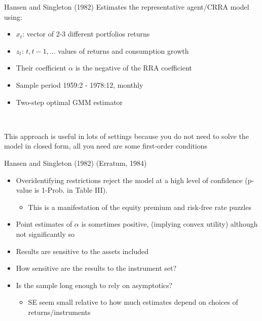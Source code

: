 \documentclass[xcolor=table, aspectratio=169]{beamer}
\begin{document}
\begin{frame}{Hansen and Singleton (1982)}
Estimates the representative agent/CRRA model using:
\begin{itemize}
\item $x_{t}$: vector of 2-3 different portfolios returns
\item $z_{t}$: $t, t-1, \ldots$ values of returns and consumption growth
\item Their coefficient $\alpha$ is the negative of the RRA coefficient
\item Sample period 1959:2 - 1978:12, monthly
\item Two-step optimal GMM estimator
\end{itemize}

~

This approach is useful in lots of settings because you do not need to solve the model in closed form, all you need are some first-order conditions
\end{frame}



\begin{frame}{Hansen and Singleton (1982) (Erratum, 1984)}
\begin{itemize}
\item Overidentifying restrictions reject the model at a high level of confidence (p-value is 1-Prob. in Table III).
\begin{itemize}
\item This is a manifestation of the equity premium and risk-free rate puzzles
\end{itemize}

\item Point estimates of $\alpha$ is sometimes positive, (implying convex utility) although not significantly so

\item Results are sensitive to the assets included

\item How sensitive are the results to the instrument set?

\item Is the sample long enough to rely on asymptotics?
\begin{itemize}
\item SE seem small relative to how much estimates depend on choices of returns/instruments
\end{itemize}
\end{itemize}
\end{frame}
\end{document}
